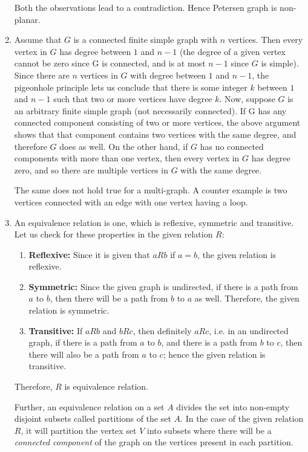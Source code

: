 \documentclass{article}
\begin{document}
\begin{enumerate}
Both the observations lead to a contradiction. Hence Petersen graph is non-planar.

\item  Assume that $G$ is a connected finite simple graph with $n$ vertices. Then every vertex in $G$ has degree between $1$ and $n-1$ (the degree of a given vertex cannot be zero since G is connected, and is at most $n-1$ since $G$ is simple). Since there are $n$ vertices in $G$ with degree between $1$ and $n-1$, the pigeonhole principle lets us conclude that there is some integer $k$ between $1$ and $n-1$ such that two or more vertices have degree $k$. Now, suppose $G$ is an arbitrary finite simple graph (not necessarily connected). If G has any connected component consisting of two or more vertices, the above argument shows that that component contains two vertices with the same degree, and therefore $G$ does as well. On the other hand, if $G$ has no connected components with more than one vertex, then every vertex in $G$ has degree zero, and so there are multiple vertices in $G$ with the same degree.

The same does not hold true for a multi-graph. A counter example is two vertices connected with an edge with one vertex having a loop.


\item  An equivalence relation is one, which is reflexive, symmetric and transitive. Let us check for these properties in the given relation $R$:

\begin{enumerate}
\item \textbf{Reflexive: } Since it is given that $aRb$ if $a=b$, the given relation is reflexive.
\item \textbf{Symmetric: } Since the given graph is undirected, if there is a path from $a$ to $b$, then there will be a path from $b$ to $a$ as well. Therefore, the given relation is symmetric.
\item \textbf{Transitive: } If $aRb$ and $bRc$, then definitely $aRc$, i.e. in an undirected graph, if there is a path from $a$ to $b$, and there is a path from $b$ to $c$, then there will also be a path from $a$ to $c$; hence the given relation is transitive.

\end{enumerate}

Therefore, $R$ is equivalence relation.

Further, an equivalence relation on a set $A$ divides the set into non-empty disjoint subsets called partitions of the set $A$. In the case of the given relation $R$, it will partition the vertex set $V$ into subsets where there will be a \textit{connected component} of the graph on the vertices present in each partition.


\end{enumerate}
\end{document}
